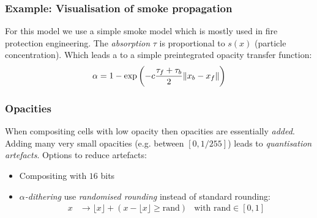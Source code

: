 \subsubsection{Example: Visualisation of smoke propagation}
For this model we use a simple smoke model which is mostly used in fire protection engineering.
The \emph{absorption} $\tau$ is proportional to $s(x)$ (particle concentration). Which leads a to a simple preintegrated opacity transfer function:
\begin{align*}
    \alpha = 1-\exp\left( 
        - c {\tau_f+\tau_b \over 2}\norm{x_b - x_f}
    \right)
\end{align*}

\subsubsection{Opacities}
When compositing cells with low opacity then opacities are essentially \emph{added}. Adding many very small opacities (e.g. between $[0, 1/255]$) leads to \emph{quantisation artefacts}.
Options to reduce artefacts:
\begin{itemize}
    \item Compositing with $16$ bits
    \item \emph{$\alpha$-dithering} 
        use \emph{randomised rounding} instead of standard rounding:
        \begin{align*}
             x &\rightarrow \lfloor x \rfloor + \left( x - \lfloor x\rfloor \geq \text{rand} \right) &\text{with rand}\in [0,1]
        \end{align*}
        
\end{itemize}

